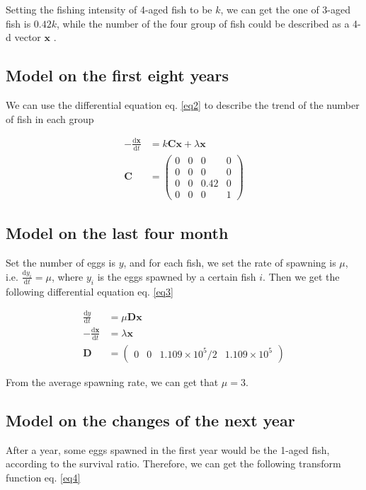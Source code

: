 \documentclass{IEEEtran}
\begin{document}
Setting the fishing intensity of 4-aged fish to be $k$, we can get the one of 3-aged fish is $0.42k$, while the number of the four group of fish could be described as a 4-d vector $\bm x$ .

\subsection{Model on the first eight years}

We can use the differential equation eq. \ref{eq2} to describe the trend of the number of fish in each group

\begin{align}
    \label{eq2}
    -\frac{\mathrm d \bm x}{\mathrm d t} &= k \mathbf C \bm x + \lambda \bm x \\
    \mathbf C &= \begin{pmatrix}0&0&0&0\\0&0&0&0\\0&0&0.42&0\\0&0&0&1\end{pmatrix}
\end{align}
\subsection{Model on the last four month}
Set the number of eggs is $y$, and for each fish, we set the rate of spawning is $\mu$, i.e. $\frac {\mathrm d y_i}{\mathrm d t} = \mu$, where $y_i$ is the eggs spawned by a certain fish $i$. Then we get the following differential equation eq. \ref{eq3}

\begin{align}
    \label{eq3}
    \frac {\mathrm d y}{\mathrm d t} &= \mu \mathbf D \bm x\\
    -\frac{\mathrm d \bm x}{\mathrm d t} &=\lambda \bm x\\
    \mathbf D &= \begin{pmatrix} 0 & 0 & 1.109\times10^5/2&1.109\times10^5\end{pmatrix}
\end{align}

From the average spawning rate, we can get that $\mu = 3$.

\subsection{Model on the changes of the next year}

After a year, some eggs spawned in the first year would be the 1-aged fish, according to the survival ratio. Therefore, we can get the following transform function eq. \ref{eq4}
\end{document}

